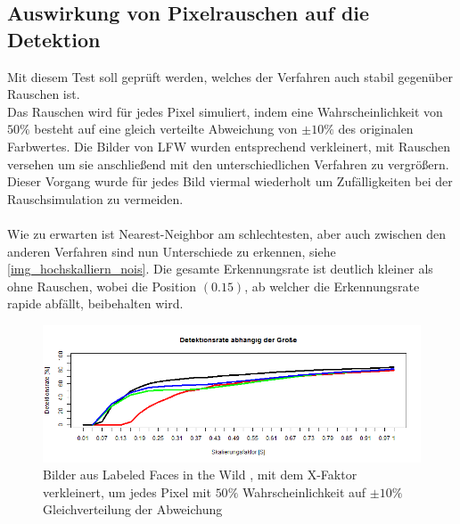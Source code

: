 \subsection{Auswirkung von Pixelrauschen auf die Detektion}
Mit diesem Test soll geprüft werden, welches der Verfahren auch stabil gegenüber Rauschen ist.\\
Das Rauschen wird für jedes Pixel simuliert, indem eine Wahrscheinlichkeit von $50\%$ besteht auf eine gleich verteilte Abweichung von $\pm 10\%$ des originalen Farbwertes. Die Bilder von LFW \cite{database_Face} wurden entsprechend verkleinert, mit Rauschen versehen um sie anschließend mit den unterschiedlichen Verfahren zu vergrößern. Dieser Vorgang wurde für jedes Bild viermal wiederholt um Zufälligkeiten bei der Rauschsimulation zu vermeiden.\\\\
Wie zu erwarten ist Nearest-Neighbor am schlechtesten, aber auch zwischen den anderen Verfahren sind nun Unterschiede zu erkennen, siehe \autoref{img_hochskalliern_nois}. Die gesamte Erkennungsrate ist deutlich kleiner als ohne Rauschen, wobei die Position $(0.15)$, ab welcher die Erkennungsrate rapide abfällt, beibehalten wird.
\begin{figure}
	\centering
	\includegraphics[width=\linewidth]{img_Skalierung/Hochskalliern_Nois}
	\caption{Bilder aus Labeled Faces in the Wild \cite{database_Face}, mit dem X-Faktor verkleinert, um jedes Pixel mit $50\%$ Wahrscheinlichkeit auf $\pm 10\%$ Gleichverteilung der Abweichung}
	\label{img_hochskalliern_nois}
\end{figure}

